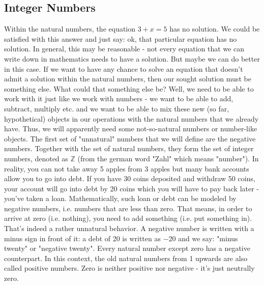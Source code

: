 
\subsection{Integer Numbers}
Within the natural numbers, the equation $3 + x = 5$ has no solution. We could be satisfied with this answer and just say: ok, that particular equation has no solution. In general, this may be reasonable - not every equation that we can write down in mathematics needs to have a solution. But maybe we can do better in this case. If we want to have any chance to solve an equation that doesn't admit a solution within the natural numbers, then our sought solution must be something else. What could that something else be? Well, we need to be able to work with it just like we work with numbers - we want to be able to add, subtract, multiply etc. and we want to be able to mix these new (so far, hypothetical) objects in our operations with the natural numbers that we already have. Thus, we will apparently need some not-so-natural numbers or number-like objects. The first set of "unnatural" numbers that we will define are the negative numbers. Together with the set of natural numbers, they form the set of integer numbers, denoted as $\mathbb{Z}$ (from the german word "Zahl" which means "number"). In reality, you can not take away 5 apples from 3 apples but many bank accounts allow you to go into debt. If you have 30 coins deposited and withdraw 50 coins, your account will go into debt by 20 coins which you will have to pay back later - you've taken a loan. Mathematically, such loan or debt can be modeled by negative numbers, i.e. numbers that are less than zero. That means, in order to arrive at zero (i.e. nothing), you need to add something (i.e. put something in). That's indeed a rather unnatural behavior.  A negative number is written with a minus sign in front of it: a debt of 20 is written as $-20$ and we say: "minus twenty" or "negative twenty". Every natural number except zero has a negative counterpart. In this context, the old natural numbers from 1 upwards are also called positive numbers. Zero is neither positive nor negative - it's just neutrally zero. 

